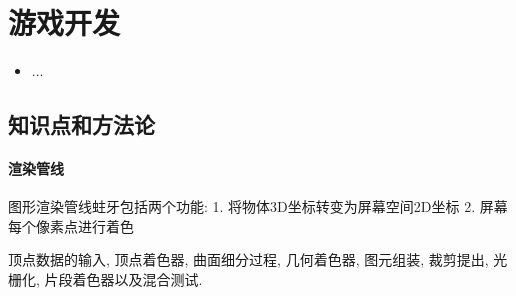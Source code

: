\chapter{游戏开发}
\label{chap1}
\begin{itemize}[noitemsep,topsep=0pt,parsep=0pt,partopsep=0pt]
	\item ...
\end{itemize}

\section{知识点和方法论}
\subsubsection{渲染管线}
图形渲染管线蛀牙包括两个功能:
1. 将物体3D坐标转变为屏幕空间2D坐标
2. 屏幕每个像素点进行着色

顶点数据的输入, 顶点着色器, 曲面细分过程, 几何着色器, 图元组装, 裁剪提出, 光栅化, 片段着色器以及混合测试.